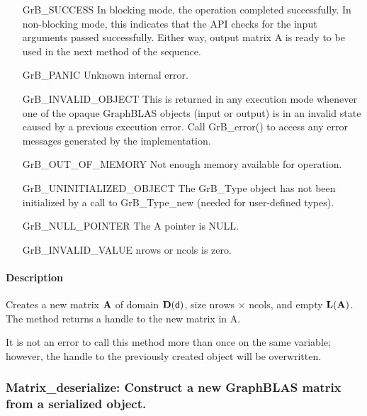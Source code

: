 \begin{itemize}[leftmargin=2.1in]
    \item[{\sf GrB\_SUCCESS}]         In blocking mode, the operation completed
    successfully. In non-blocking mode, this indicates that the API checks 
    for the input arguments passed successfully. Either way, output matrix 
    {\sf A} is ready to be used in the next method of the sequence.

    \item[{\sf GrB\_PANIC}]           Unknown internal error.
    
    \item[{\sf GrB\_INVALID\_OBJECT}] This is returned in any execution mode 
    whenever one of the opaque GraphBLAS objects (input or output) is in an invalid 
    state caused by a previous execution error.  Call {\sf GrB\_error()} to access 
    any error messages generated by the implementation.

    \item[{\sf GrB\_OUT\_OF\_MEMORY}] Not enough memory available for operation.
    
    \item[{\sf GrB\_UNINITIALIZED\_OBJECT}]  The {\sf GrB\_Type} object has not 
    been initialized by a call to {\sf GrB\_Type\_new} (needed for user-defined types).
    
    \item[{\sf GrB\_NULL\_POINTER}]  The {\sf A} pointer is {\sf NULL}.
    
    \item[{\sf GrB\_INVALID\_VALUE}] {\sf nrows} or {\sf ncols} is zero.
\end{itemize}

\paragraph{Description}

Creates a new matrix ${\bf A}$ of domain $\mathbf{D}({\sf d})$, size 
{\sf nrows $\times$ ncols}, and empty $\mathbf{L}({\bf A})$. The method returns a
handle to the new matrix in {\sf A}.

It is not an error to call this method more than once on the same variable;  
however, the handle to the previously created object will be overwritten. 


\subsubsection{{\sf Matrix\_deserialize}: Construct a new GraphBLAS matrix from a serialized object.}
\label{Sec:Matrix_deserialize}


